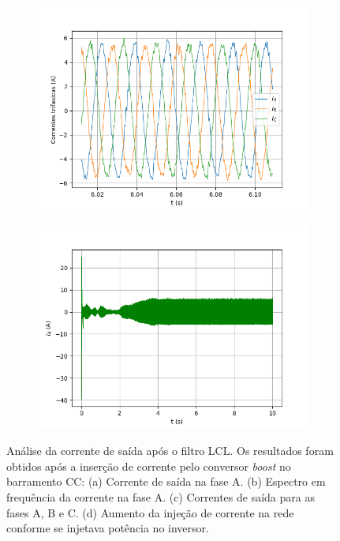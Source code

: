 \begin{figure}[ht]
\begin{subfigure}[b]{0.49\textwidth}
  		\includegraphics[width=\textwidth]{figuras/sim_figures/inversor_e_boost/corrente_ia_ib_ic.png}
  		\caption{}
 	\end{subfigure}
  	\begin{subfigure}[b]{0.49\textwidth}
  		\centering
  		\includegraphics[width=\textwidth]{figuras/sim_figures/inversor_e_boost/injecao_corrente.png}
  		\caption{}
  	\end{subfigure}
     \caption{Análise da corrente de saída após o filtro LCL. Os resultados foram obtidos após a inserção de corrente pelo conversor \textit{boost} no barramento CC: (a) Corrente de saída na fase A. (b) Espectro em frequência da corrente na fase A. (c) Correntes de saída para as fases A, B e C. (d) Aumento da injeção de corrente na rede conforme se injetava potência no inversor.}
     \label{fig:sim-corrente-saida-inversor}
\end{figure}


